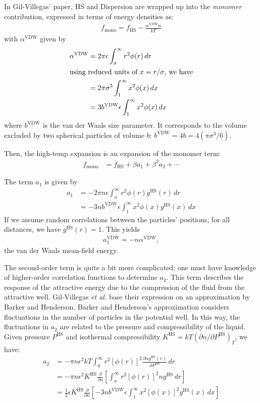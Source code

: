 \documentclass[letterpaper,twocolumn,amsmath,amssymb,prb]{revtex4-1}
\newcommand{\1}{\ensuremath{\textbf{r}_1}}
\newcommand{\2}{\ensuremath{\textbf{r}_2}}
\newcommand{\3}{\ensuremath{\textbf{r}_3}}
\newcommand{\4}{\ensuremath{\textbf{r}_4}}
\begin{document}
In Gil-Villegas' paper,\cite{gil-villegas97} HS and Dispersion are wrapped up into the
\textit{monomer} contribution, expressed in terms of energy densities
as:
\begin{align}
  f_\text{mono} = f_\text{HS} - \frac{\alpha^\text{VDW}n}{kT}
\end{align}
with $\alpha^\text{VDW}$ given by
\begin{align}
  \alpha^\text{VDW} &= 2\pi\epsilon\int_\sigma^\infty r^2\phi(r)\,dr \\
  \intertext{using reduced units of $x = r/\sigma$, we have}
  &= 2\pi\sigma^3\int_1^\infty x^2\phi(x)\,dx \\
  &= 3b^\text{VDW}\epsilon\int_1^\infty x^2\phi(x)\,dx
\end{align}
where $b^\text{VDW}$ is the van der Waals size parameter. It
corresponds to the volume excluded by two spherical particles of
volume $b$: $b^\text{VDW} = 4b = 4\left(\pi\sigma^3/6\right)$.

Then, the high-temp expansion is an expansion of the monomer term:
\begin{align}
  f_\text{mono} &= f_\text{HS} + \beta a_1 + \beta^2 a_2 + \cdots
\end{align}

The term $a_1$ is given by
\begin{align}
  a_1 &= -2\pi n \epsilon\int_\sigma^\infty r^2\phi(r)g^\text{HS}(r)\,dr \\
  &= -3 n  b^\text{VDW}\epsilon\int_1^\infty x^2\phi(x)g^\text{HS}(x)\,dx
\end{align}
If we assume random correlations between the particles' positions, for
all distances, we have $g^\text{HS}(r) = 1$. This yields
\begin{align}
  a_1^\text{VDW} = - n \alpha^\text{VDW},
\end{align}
the van der Waals mean-field energy.

The second-order term is quite a bit more complicated; one must have
knowledge of higher-order correlation functions to determine
$a_2$. This term describes the response of the attractive energy due
to the compression of the fluid from the attractive well. Gil-Villegas
\emph{et al.} base their expression on an approximation by Barker and
Henderson.\cite{Barker67} Barker and Henderson's approximation
considers fluctuations in the number of particles in the potential
well. In this way, the fluctuations in $a_2$ are related to the
pressure and compressibility of the liquid. Given pressure
$P^\text{HS}$ and isothermal compressibility $K^\text{HS} =
kT\left(\partial n /\partial P^\text{HS}\right)_T$, we have:
\begin{align}
  a_2 &= -\pi n \epsilon^2kT\int_0^\infty r^2\left[\phi(r)\right]^2\frac{\partial n  g^\text{HS}(r)}{\partial P^\text{HS}}\,dr \\
  &= -\pi n \epsilon^2K^\text{HS}\frac{\partial}{\partial n }\left[\int_\sigma^\infty r^2\left[\phi(r)\right]^2 n  g^\text{HS}\,dr\right] \\
  &= \frac{1}{2}\epsilon K^\text{HS}\frac{\partial}{\partial n }\left[-3 n  b^\text{VDW}\epsilon\int_1^\infty x^2\left[\phi(x)\right]^2 g^\text{HS}(x)\,dx \right]
\end{align}
\end{document}
